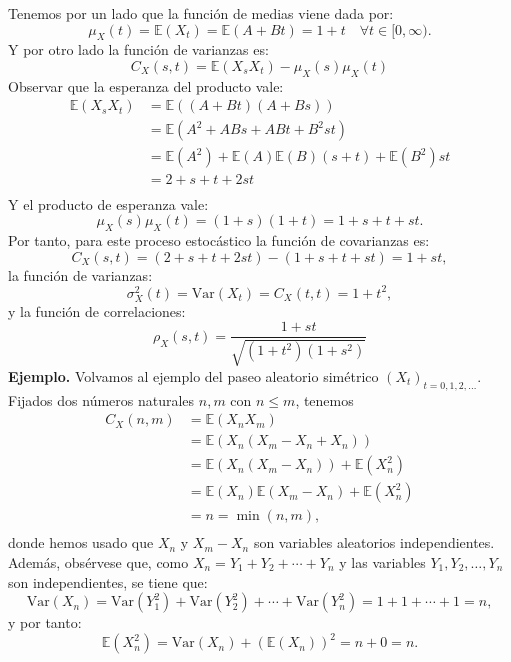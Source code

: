 Tenemos por un lado que la función de medias viene dada por:  \[
    \mu_X(t)=\mathbb{E}(X_t)=\mathbb{E}(A+Bt)=1+t\quad\forall t\in [0,\infty).
\] 
Y por otro lado la función de varianzas es: \[
C_X(s,t)=\mathbb{E}(X_sX_t)-\mu_X(s)\mu_X(t)
\] 
Observar que la esperanza del producto vale:
\[
\begin{aligned}
    \mathbb{E}(X_sX_t)&= \mathbb{E}\left( (A+Bt)(A+Bs) \right)  \\
                      &= \mathbb{E}(A^2+ABs+ABt+B^2st) \\
                      &= \mathbb{E}(A^2)+\mathbb{E}(A)\mathbb{E}(B)(s+t)+\mathbb{E}(B^2)st \\
                      &= 2+s+t+2st \\
\end{aligned}
\] 
Y el producto de esperanza vale: \[
\mu_X(s)\mu_X(t)=(1+s)(1+t)=1+s+t+st.
\] 
Por tanto, para este proceso estocástico la función de covarianzas es: \[
C_X(s,t)=(2+s+t+2st)-(1+s+t+st)=1+st,
\] la función de varianzas: \[
\sigma_X^2(t)=\mathrm{Var}(X_t)=C_X(t,t)=1+t^2,
\] y la función de correlaciones: \[
\rho_X(s,t)=\dfrac{1+st}{\sqrt{(1+t^2)(1+s^2)} }
\] 
\textbf{Ejemplo.} Volvamos al ejemplo del paseo aleatorio simétrico $(X_t)_{t=0,1,2,\dots}$. Fijados dos números naturales $n,m$ con  $n\le m$, tenemos \[
\begin{aligned}
    C_X(n,m)&=\mathbb{E}\left(X_nX_m\right)\\
            &= \mathbb{E}\left( X_n(X_m-X_n+X_n) \right)  \\
            &= \mathbb{E}\left( X_n(X_m-X_n) \right) +\mathbb{E}\left( X_n^2 \right)  \\
            &= \mathbb{E}(X_n)\mathbb{E}(X_m-X_n)+ \mathbb{E}(X_n^2) \\
            &= n =\min(n,m),\\
\end{aligned}
\] donde hemos usado que $X_n$ y  $X_m-X_n$ son variables aleatorios independientes. Además, obsérvese que, como  $X_n=Y_1+Y_2+\cdots+Y_n$ y las variables $Y_1,Y_2,\dots,Y_n$ son independientes, se tiene que: \[
\mathrm{Var}(X_n)=\mathrm{Var}(Y_1^2)+\mathrm{Var}(Y_2^2)+\cdots+\mathrm{Var}(Y_n^2)=1+1+\cdots+1=n,
\] y por tanto: \[
\mathbb{E}(X_n^2)=\mathrm{Var}(X_n)+(\mathbb{E}(X_n))^2=n+0=n.
\] 
